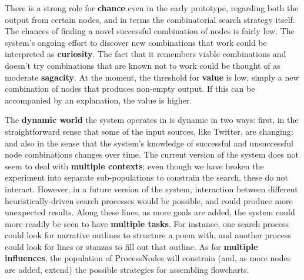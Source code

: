 There is a strong role for \textbf{chance} even in the early
prototype, regarding both the output from certain nodes, and in terms
the combinatorial search strategy itself.  The chances of finding a
novel successful combination of nodes is fairly low.  The system's
ongoing effort to discover new combinations that work could be
interpreted as \textbf{curiosity}.  The fact that it remembers viable
combinations and doesn't try combinations that are known not to work
could be thought of as moderate \textbf{sagacity}.  At the moment, the
threshold for \textbf{value} is low, simply a new combination of nodes
that produces non-empty output.  If this can be accompanied by an
explanation, the value is higher.

The \textbf{dynamic world} the system operates in is dynamic in two
ways: first, in the straightforward sense that some of the input
sources, like Twitter, are changing; and also in the sense that the
system's knowledge of successful and unsuccessful node combinations
changes over time.  The current version of the system does not seem to
deal with \textbf{multiple contexts}; even though we have broken the
experiment into separate sub-populations to constrain the search,
these do not interact.  However, in a future version of the system,
interaction between different heuristically-driven search processes
would be possible, and could produce more unexpected results.  Along
these lines, as more goals are added, the system could more readily be
seen to have \textbf{multiple tasks}.  For instance, one search
process could look for narrative outlines to structure a poem with,
and another process could look for lines or stanzas to fill out that
outline.  As for \textbf{multiple influences}, the population of
ProcessNodes will constrain (and, as more nodes are added, extend) the
possible strategies for assembling flowcharts.

